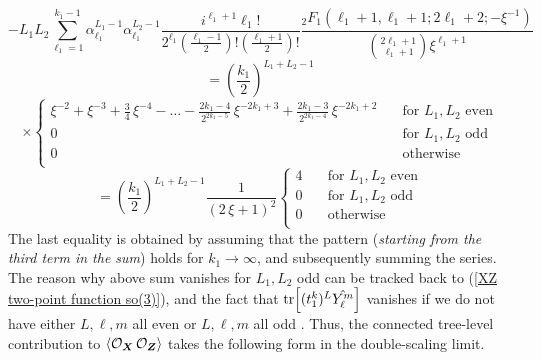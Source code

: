 \newpage
%
%
\begin{equation*}
-L_1 L_2 \sum_{\ell_1 = 1}^{k_1 - 1}
\alpha_{\ell_1}^{L_1 - 1}
\alpha_{\ell_1}^{L_2 - 1}
\frac{i^{\ell_1+1} \ell_1!}
{2^{\ell_1} \left( \frac{\ell_1 - 1}{2} \right)!
\left( \frac{\ell_1 + 1}{2} \right)!}
\frac{{}_2 F_1(\ell_1 + 1, \ell_1 + 1; 2 \ell_1 + 2; -\xi^{-1})}{\binom{2 \ell_1 + 1}{\ell_1 + 1} \xi^{\ell_1+1}}
\end{equation*}
%
%
\begin{equation*}
=
\left( \frac{k_1}{2} \right)^{L_1 + L_2 - 1}
\end{equation*}
%
%
\begin{equation*}
\times
\begin{cases}
		\xi^{-2} + \xi^{-3} + \frac{3}{4} \, \xi^{-4}
		-
    	\ldots
    	- \frac{2 k_1 - 4}{2^{2 k_1 - 5}} \, \xi^{-2 k_1 + 3}
    	+ \frac{2 k_1 - 3}{2^{2 k_1 - 4}} \, \xi^{-2 k_1 + 2}	
		& \quad \text{for } L_1,L_2 \text{ even} \\
		0
    	& \quad \text{for } L_1,L_2 \text{ odd} \\
    	0
    	& \quad \text{otherwise } \\
  \end{cases}
\end{equation*}
%
%
\begin{equation}
=
\left( \frac{k_1}{2} \right)^{L_1 + L_2 - 1}
\frac{1}{(2 \, \xi + 1)^2}
\begin{cases}
    	4
		& \quad \text{for } L_1,L_2 \text{ even} \\	
    	0
    	& \quad \text{for } L_1,L_2 \text{ odd} \\
    	0
    	& \quad \text{otherwise } \\
\end{cases}
\end{equation}
%
%
The last equality is obtained by assuming that the pattern (\textit{starting from the third term in the sum}) holds for $k_1 \to \infty$, and subsequently summing the series. The reason why above sum vanishes for $L_1, L_2$ odd can be tracked back to (\ref{XZ two-point function so(3)}), and the fact that $\tr[(t_1^k)^L \hat{Y^m_\ell}]$ vanishes if we do not have either $L,\ell,m$ all even or $L,\ell,m$ all odd \cite{Two-point functions in D5-D3}. Thus, the connected tree-level contribution to $\expval{\mathcal{O}_{\boldsymbol{X}} \, \mathcal{O}_{\boldsymbol{Z}}}$ takes the following form in the double-scaling limit.
%
%
